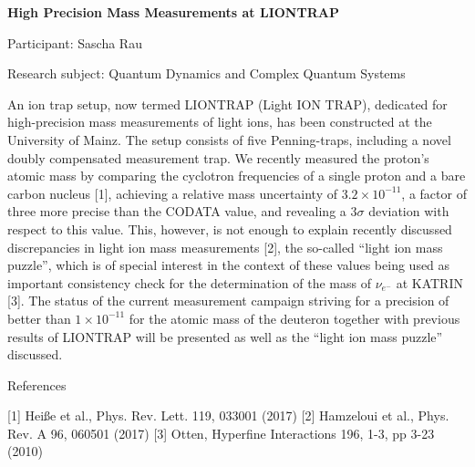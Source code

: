 \begin{minipage}[t]{1.0\textwidth}

\begin{center}

{{\large\bfseries High Precision Mass Measurements at LIONTRAP}\par}

\end{center}

{\noindent Participant: Sascha Rau\par} 

{\noindent Research subject: Quantum Dynamics and Complex Quantum Systems\par}\medskip

\noindent An ion trap setup, now termed LIONTRAP (Light ION TRAP), dedicated for high-precision mass measurements of light ions, has been constructed at the University of Mainz.
The setup consists of five Penning-traps, including a novel doubly compensated measurement trap. We recently measured the proton’s atomic mass by comparing the cyclotron frequencies of a single proton and a bare carbon nucleus [1], achieving a relative mass uncertainty of $3.2 \times10^{-11}$, a factor of three more precise than the CODATA value, and revealing a $3\sigma$ deviation with respect to this value. This, however, is not enough to explain recently discussed discrepancies in light ion mass measurements [2], the so-called “light ion mass puzzle”, which is of special interest in the context of these values being used as important consistency check for the determination of the mass of $\nu_{e^-}$ at KATRIN [3].
The status of the current measurement campaign striving for a precision of better than $1\times 10^{-11}$ for the atomic mass of the deuteron together with previous results of LIONTRAP will be presented as well as the “light ion mass puzzle” discussed.

References

[1]	Hei{\ss}e et al., Phys. Rev. Lett. 119, 033001 (2017)
[2]	Hamzeloui et al., Phys. Rev. A 96, 060501 (2017)
[3] 	Otten, Hyperfine Interactions 196, 1-3, pp 3-23 (2010)
\par\end{minipage}

\hfill 

